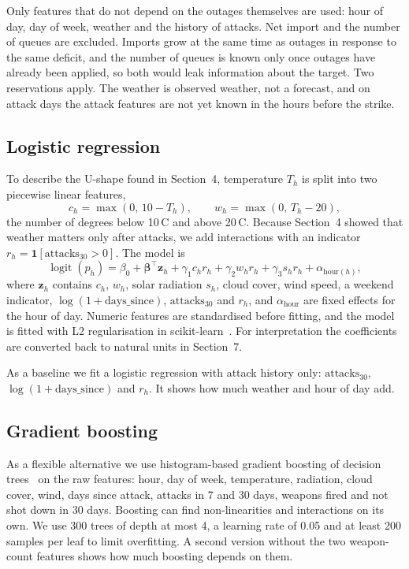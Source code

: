 \documentclass[9pt,twocolumn,letterpaper]{extarticle}
\begin{document}
Only features that do not depend on the outages themselves are used: hour of day, day of week, weather and the history of attacks. Net import and the number of queues are excluded. Imports grow at the same time as outages in response to the same deficit, and the number of queues is known only once outages have already been applied, so both would leak information about the target. Two reservations apply. The weather is observed weather, not a forecast, and on attack days the attack features are not yet known in the hours before the strike.

\subsection{Logistic regression}
To describe the U-shape found in Section~4, temperature $T_h$ is split into two piecewise linear features,
\begin{equation}
c_h = \max(0,\, 10 - T_h), \qquad w_h = \max(0,\, T_h - 20),
\end{equation}
the number of degrees below 10\,\textdegree C and above 20\,\textdegree C. Because Section~4 showed that weather matters only after attacks, we add interactions with an indicator $r_h = \mathbf{1}[\text{attacks}_{30} > 0]$. The model is
\begin{equation}
\operatorname{logit}(p_h) = \beta_0 + \boldsymbol{\beta}^{\top}\mathbf{z}_h + \gamma_1 c_h r_h + \gamma_2 w_h r_h + \gamma_3 s_h r_h + \alpha_{\text{hour}(h)},
\end{equation}
where $\mathbf{z}_h$ contains $c_h$, $w_h$, solar radiation $s_h$, cloud cover, wind speed, a weekend indicator, $\log(1+\text{days\_since})$, $\text{attacks}_{30}$ and $r_h$, and $\alpha_{\text{hour}}$ are fixed effects for the hour of day. Numeric features are standardised before fitting, and the model is fitted with L2 regularisation in scikit-learn~\cite{sklearn}. For interpretation the coefficients are converted back to natural units in Section~7.

As a baseline we fit a logistic regression with attack history only: $\text{attacks}_{30}$, $\log(1+\text{days\_since})$ and $r_h$. It shows how much weather and hour of day add.

\subsection{Gradient boosting}
As a flexible alternative we use histogram-based gradient boosting of decision trees~\cite{friedman,lightgbm} on the raw features: hour, day of week, temperature, radiation, cloud cover, wind, days since attack, attacks in 7 and 30 days, weapons fired and not shot down in 30 days. Boosting can find non-linearities and interactions on its own. We use 300 trees of depth at most 4, a learning rate of 0.05 and at least 200 samples per leaf to limit overfitting. A second version without the two weapon-count features shows how much boosting depends on them.
\end{document}
